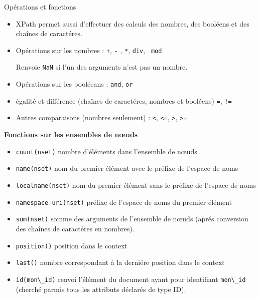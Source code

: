 \begin{frame}[allowframebreaks]{Opérations et fonctions}

\begin{itemize}
\item XPath permet aussi d'effectuer des calculs des nombres, des booléens et des cha\^{i}nes de caractéres.

\item Opérations sur les nombres : \verb?+?, \verb?-? , \verb?*?, \verb?div?, \verb? mod?\\ 

Renvoie \verb?NaN? si l'un des arguments n'est pas un nombre. 

\item Opérations sur les booléeans : \verb?and?, \verb?or?

\item égalité et différence (cha\^{i}nes de caractéres, nombres et booléens)  \verb?=?, \verb?!=? 

\item Autres comparaisons (nombres seulement) : \verb?<?, \verb?<=?, \verb?>?, \verb?>= ?

\end{itemize}

\framebreak

{\bf Fonctions sur les ensembles de n{\oe}uds}
\begin{itemize}
\item \verb?count(nset)? nombre d'éléments dans l'ensemble de n{\oe}uds. 
\item \verb?name(nset)? nom du premier élément avec le préfixe de l'espace de noms
\item \verb?localname(nset)? nom du premier élément sans le préfixe de l'espace de noms
\item \verb?namespace-uri(nset)? préfixe de l'espace de noms du premier élément 
\item \verb?sum(nset)? somme des arguments de l'ensemble de n{\oe}uds (aprés conversion des cha\^{i}nes de caractéres en nombres).
\item \verb?position()? position dans le context
\item \verb?last()? nombre correspondant à la derniére position dans le context
\item \verb?id(mon\_id)? renvoi l'élément du document ayant pour identifiant \verb?mon\_id? (cherché parmis tous les attributs déclarés de type ID).
\end{itemize}


\end{frame}
